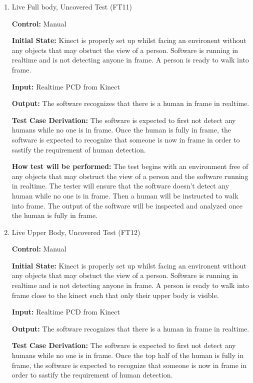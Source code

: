 \documentclass[12pt, titlepage]{article}
\begin{document}
\begin{enumerate}

\item{Live Full body, Uncovered Test (FT11)\\}

\textbf{Control:} Manual
					
\textbf{Initial State:} Kinect is properly set up whilst facing an environent without any objects that may obstuct the view of a person. Software is running in realtime and is not detecting anyone in frame. A person is ready to walk into frame.
					
\textbf{Input:} Realtime PCD from Kinect
					
\textbf{Output:} The software recognizes that there is a human in frame in realtime.

\textbf{Test Case Derivation:} The software is expected to first not detect any humans while no one is in frame. Once the human is fully in frame, the software is expected to recognize that someone is now in frame in order to sastify the requirement of human detection.
					
\textbf{How test will be performed:} The test begins with an environment free of any objects that may obstruct the view of a person and the software running in realtime. The tester will ensure that the software doesn't detect any human while no one is in frame. Then a human will be instructed to walk into frame. The output of the software will be inspected and analyzed once the human is fully in frame. 
					
\item{Live Upper Body, Uncovered Test (FT12)\\}

\textbf{Control:} Manual
					
\textbf{Initial State:} Kinect is properly set up whilst facing an environent without any objects that may obstuct the view of a person. Software is running in realtime and is not detecting anyone in frame. A person is ready to walk into frame close to the kinect such that only their upper body is visible.
					
\textbf{Input:} Realtime PCD from Kinect
			
\textbf{Output:} The software recognizes that there is a human in frame in realtime.

\textbf{Test Case Derivation:} The software is expected to first not detect any humans while no one is in frame. Once the top half of the human is fully in frame, the software is expected to recognize that someone is now in frame in order to sastify the requirement of human detection.
					

\end{enumerate}
\end{document}
